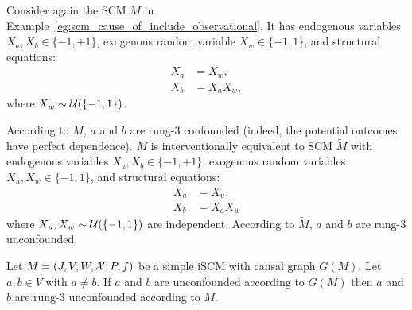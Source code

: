 \begin{Eg}
  Consider again the SCM $M$ in Example~\ref{eg:scm_cause_of_include_observational}.
  It has endogenous variables $X_a, X_b \in \{-1,+1\}$, exogenous random variable $X_w \in \{-1,1\}$, and structural equations:
  \begin{align*}
    X_a &= X_w, \\
    X_b &= X_a X_w,
  \end{align*}
  where $X_w \sim \mathcal{U}(\{-1,1\})$.
  
  According to $M$, $a$ and $b$ are rung-3 confounded (indeed, the potential outcomes have perfect dependence).
  $M$ is interventionally equivalent to SCM $\tilde{M}$ with endogenous variables $X_a, X_b \in \{-1,+1\}$, exogenous random variables $X_u,X_w \in \{-1,1\}$, and structural equations:
  \begin{align*}
    X_a &= X_u, \\
    X_b &= X_a X_w
  \end{align*}
  where $X_u, X_w \sim \mathcal{U}(\{-1,1\})$ are independent.
  According to $\tilde{M}$, $a$ and $b$ are rung-3 unconfounded.
\end{Eg}
\begin{Prp}\label{prp:graph_unconfounded_scm_rung3_unconfounded}
  Let $M = \left ( J, V, W, \mathcal{X}, P, f \right )$ be a simple iSCM with causal graph $G(M)$.
  Let $a, b \in V$ with $a \ne b$.
  If $a$ and $b$ are unconfounded according to $G(M)$ then $a$ and $b$ are rung-3 unconfounded according to $M$.
\end{Prp}
